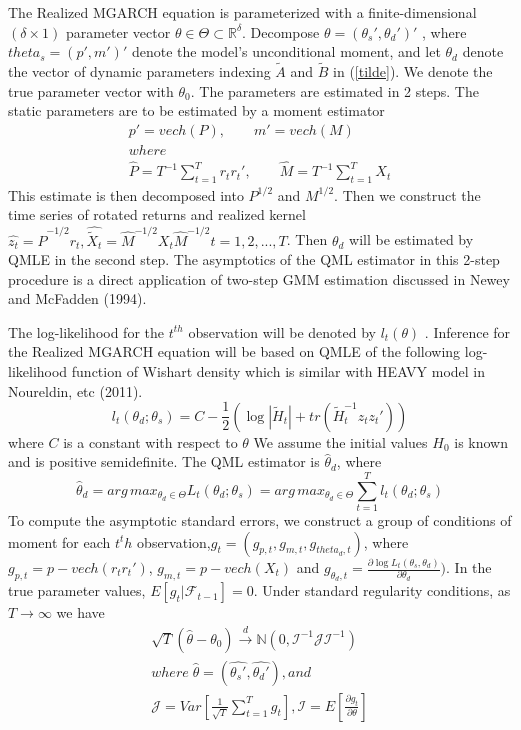 \documentclass[titlepage,11pt]{article}
\begin{document}
The Realized MGARCH equation is parameterized with a finite-dimensional $(\delta \times 1)$ parameter vector $\theta\in \Theta\subset \mathbb{R}^\delta $. Decompose $\theta = (\theta_s',\theta_d')'$ , where $theta_s =(p', m')' $  denote the model's unconditional moment, and let $\theta_d$ denote the vector of dynamic parameters indexing $\tilde{A}$ and $\tilde{B}$ in (\ref{tilde}). We denote the true parameter vector with $\theta_0$. 
The parameters are estimated in 2 steps. The static parameters are to be estimated by a moment estimator
\begin{align*}
p' = vech (P) , \qquad m' = vech(M)\\   
where \\
\hat{P} = T^{-1} \sum_{t=1}^{T} r_t r_t' , \qquad 
\hat{M} = T^{-1} \sum_{t=1}^{T} X_t
\end{align*}
This estimate is then decomposed into $P^{1/2}$ and $M^{1/2}$. Then we construct the time series of rotated returns and realized kernel $\hat{z_t} = \hat{P}^{-1/2}r_t,\hat{\tilde{X}_t} = \hat{M}^{-1/2}X_t\hat{M}^{-1/2} t=1,2,...,T$. Then $\theta_d$ will be estimated by QMLE in the second step. The asymptotics of the QML estimator in this 2-step procedure is a direct application of two-step GMM estimation discussed in Newey and McFadden (1994).

The log-likelihood for the $t^{th}$  observation will be denoted by $l_{t}(\theta)$ . Inference for the Realized MGARCH equation will be based on QMLE of the following log-likelihood function of Wishart density which is similar with HEAVY model in Noureldin, etc (2011).
\begin{equation}
l_{t}(\theta_d;\theta_s) = C-\frac{1}{2}(\log|\tilde{H}_t|+tr(\tilde{H}_t^{-1} z_t z_t'))
\end{equation}
where $C$ is a constant with respect to $\theta$
We assume the initial values $H_0$ is known and is positive semidefinite. 
The QML estimator is $\hat{\theta}_d$, where 
\[\hat{\theta}_d = arg\,max_{\theta_d \in \Theta} L_{t}(\theta_d;\theta_s)=arg\,max_{\theta_d \in \Theta} \sum_{t=1}^{T} l_{t}(\theta_d;\theta_s)\]
To compute the asymptotic standard errors, we construct a group of conditions of moment for each $t^th$ observation,$g_t=(g_{p,t},g_{m,t},g_{theta_d,t})$, where $g_{p,t} = p-vech(r_t r_t')$, $g_{m,t} = p-vech(X_t)$ and $g_{\theta_d,t} =\frac{\partial \log L_{t}(\theta_s,\theta_d)}{\partial \theta_d}) $. In the true parameter values, $E[g_t|\mathcal{F}_{t-1}]=0$. Under standard regularity conditions, as $T \rightarrow \infty $ we have
\begin{align}
\sqrt{T} (\hat{\theta}-\theta_0) \overset{d}{\rightarrow} \mathbb{N} (0, \mathcal{I}^{-1} \mathcal{J} \mathcal{I}^{-1})\\
where \; \hat{\theta}= (\hat{\theta_s'}, \hat{\theta_d'}), and \nonumber \\
\mathcal{J}=Var \left[\frac{1}{\sqrt{T}} \sum_{t=1}^{T}g_t\right], \mathcal{I}=E \left[\frac{\partial g_t}{\partial \theta}\right]
\end{align} 
\end{document}
